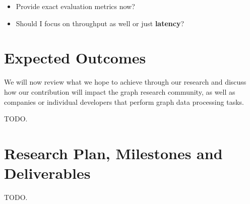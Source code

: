 \documentclass[a4paper,11pt]{article}
\begin{document}
\begin{itemize}
	
	\item Provide exact evaluation metrics now?
	\item Should I focus on throughput as well or just \textbf{latency}?	
	
\end{itemize}




\section{Expected Outcomes} \label{outcomes}

\par We will now review what we hope to achieve through our research and discuss how our contribution will impact the graph research community, as well as companies or individual developers that perform graph data processing tasks.

\medskip

\par TODO.




\section{Research Plan, Milestones and Deliverables} \label{milestones}

\par TODO.
\end{document}
